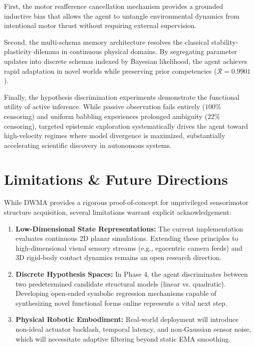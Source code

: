 \documentclass[preprint,12pt]{elsarticle}
\begin{document}
First, the motor reafference cancellation mechanism provides a grounded inductive bias that allows the agent to untangle environmental dynamics from intentional motor thrust without requiring external supervision. 

Second, the multi-schema memory architecture resolves the classical stability-plasticity dilemma in continuous physical domains. By segregating parameter updates into discrete schemas indexed by Bayesian likelihood, the agent achieves rapid adaptation in novel worlds while preserving prior competencies ($\mathcal{R} = 0.9901$).

Finally, the hypothesis discrimination experiments demonstrate the functional utility of active inference. While passive observation fails entirely ($100\%$ censoring) and uniform babbling experiences prolonged ambiguity ($22\%$ censoring), targeted epistemic exploration systematically drives the agent toward high-velocity regimes where model divergence is maximized, substantially accelerating scientific discovery in autonomous systems.

\section{Limitations \& Future Directions}
\label{sec:limitations}
While DWMA provides a rigorous proof-of-concept for unprivileged sensorimotor structure acquisition, several limitations warrant explicit acknowledgement:
\begin{enumerate}
    \item \textbf{Low-Dimensional State Representations:} The current implementation evaluates continuous 2D planar simulations. Extending these principles to high-dimensional visual sensory streams (e.g., egocentric camera feeds) and 3D rigid-body contact dynamics remains an open research direction.
    \item \textbf{Discrete Hypothesis Spaces:} In Phase 4, the agent discriminates between two predetermined candidate structural models (linear vs. quadratic). Developing open-ended symbolic regression mechanisms capable of synthesizing novel functional forms online represents a vital next step.
    \item \textbf{Physical Robotic Embodiment:} Real-world deployment will introduce non-ideal actuator backlash, temporal latency, and non-Gaussian sensor noise, which will necessitate adaptive filtering beyond static EMA smoothing.
\end{enumerate}
\end{document}
